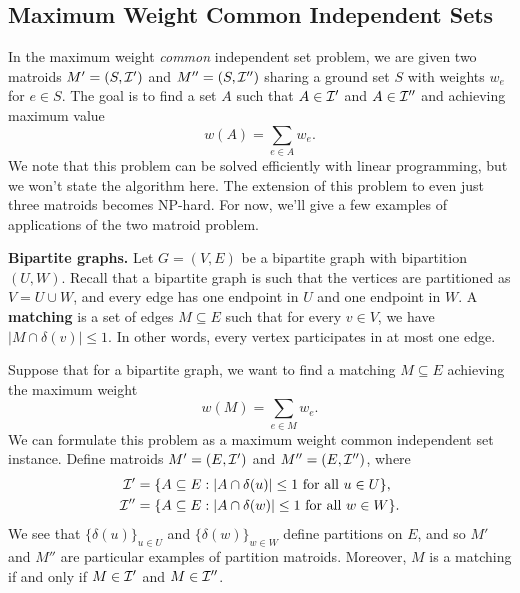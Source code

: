 \subsection{Maximum Weight Common Independent Sets} \label{subsec:4.3}
In the maximum weight \emph{common} independent set problem, we are given 
two matroids $M' = (S, {\cal I}')$ and $M'' = (S, {\cal I}'')$ sharing a 
ground set $S$ with weights $w_e$ for $e \in S$. The goal is to find 
a set $A$ such that $A \in {\cal I}'$ and $A \in {\cal I}''$ and 
achieving maximum value 
\[ w(A) = \sum_{e\in A} w_e. \] 
We note that this problem can be solved efficiently with linear programming, 
but we won't state the algorithm here. The extension of this problem 
to even just three matroids becomes NP-hard. For now, we'll give a few 
examples of applications of the two matroid problem. 

{\bf Bipartite graphs.} Let $G = (V, E)$ be a bipartite graph with 
bipartition $(U, W)$. Recall that a bipartite graph is such that 
the vertices are partitioned as $V = U \cup W$, and every edge has 
one endpoint in $U$ and one endpoint in $W$. A {\bf matching} is a set 
of edges $M \subseteq E$ such that for every $v \in V$, we have 
$|M \cap \delta(v)| \leq 1$. In other words, every vertex participates 
in at most one edge. 

Suppose that for a bipartite graph, we want to find a matching $M \subseteq E$
achieving the maximum weight
\[ w(M) = \sum_{e\in M} w_e. \] 
We can formulate this problem as a maximum weight common independent set instance. 
Define matroids $M' = (E, {\cal I}')$ and $M'' = (E, {\cal I}'')$, where 
\begin{align*}
    {\cal I}' &= \{A \subseteq E : |A \cap \delta(u)| \leq 1 \text{ for all } u \in U\}, \\ 
    {\cal I}'' &= \{A \subseteq E : |A \cap \delta(w)| \leq 1 \text{ for all } w \in W\}.
\end{align*}
We see that $\{\delta(u)\}_{u\in U}$ and $\{\delta(w)\}_{w\in W}$ define 
partitions on $E$, and so $M'$ and $M''$ are particular examples of partition 
matroids. Moreover, $M$ is a matching if and only if $M \in {\cal I}'$ and 
$M \in {\cal I}''$. 

